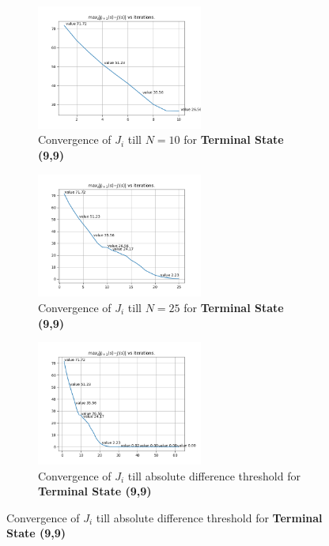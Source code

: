 \begin{figure}[h]
\begin{subfigure}
\centering
\includegraphics[angle=0,width=0.6\textwidth]{hw2/logs/t=99_N=10/convergence-till-10.png}
\caption{Convergence of $J_i$ till $N=10$ for \textbf{Terminal State (9,9)}}
\end{subfigure}

\begin{subfigure}
\centering
\includegraphics[angle=0,width=0.6\textwidth]{hw2/logs/t=99_N=25/convergence-till-25.png}
\caption{Convergence of $J_i$ till $N=25$ for \textbf{Terminal State (9,9)}}
\end{subfigure}

\begin{subfigure}
\centering
\includegraphics[angle=0,width=0.6\textwidth]{hw2/logs/t=99_N=-1/convergence-till-62.png}
\caption{Convergence of $J_i$ till absolute difference threshold for \textbf{Terminal State (9,9)}}
\end{subfigure}
\end{figure}

